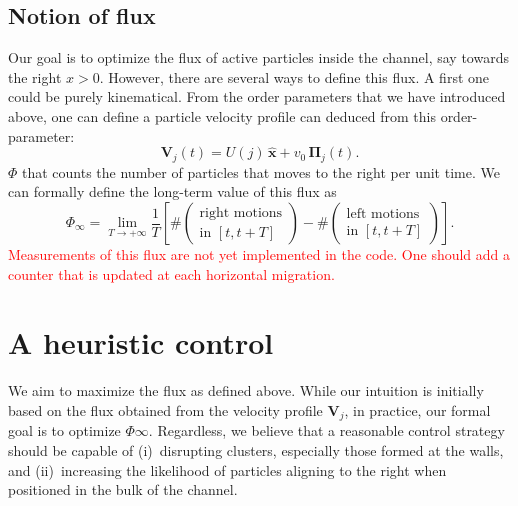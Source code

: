 \documentclass[aps,prl,twocolumn,amsmath,amssymb,superscriptaddress]{revtex4-1}
\newcommand{\obs}[1]{\textcolor{red}{#1}}
\begin{document}
\subsection{Notion of flux}
Our goal is to optimize the flux of active particles inside the channel, say towards the right $x>0$. However, there are several ways to define this flux. A first one could be purely kinematical. From the order parameters that we have introduced above, one can define a particle velocity profile can deduced from this order-parameter:
\begin{equation}
  \boldsymbol{V}_j(t) = U(j)\,\hat{\boldsymbol{x}} + v_0\,\boldsymbol{\Pi}_j(t).
\end{equation}
 $\Phi$ that counts the number of particles that moves to the right per unit time. We can formally define the long-term value of this flux as
\begin{equation}
\Phi_\infty = \!\!\lim_{T\to+\infty} \frac{1}{T}\left[\#\!\!\left(\!\!\begin{array}{c}\text{right motions}\\[-4pt]\text{in } [t,t+T]\end{array}\!\!\right) - \#\!\!\left(\!\!\begin{array}{c}\text{left motions}\\[-4pt]\text{in } [t,t+T]\end{array}\!\!\right)\right]\!.
\nonumber
\end{equation}
\obs{Measurements of this flux are not yet implemented in the code. One should add a counter that is updated at each horizontal migration.}

\section{A heuristic control}

We aim to maximize the flux as defined above. While our intuition is initially based on the flux obtained from the velocity profile $\boldsymbol{V}_j$, in practice, our formal goal is to optimize $\Phi\infty$. Regardless, we believe that a reasonable control strategy should be capable of (i)~disrupting clusters, especially those formed at the walls, and (ii)~increasing the likelihood of particles aligning to the right when positioned in the bulk of the channel.
\end{document}
